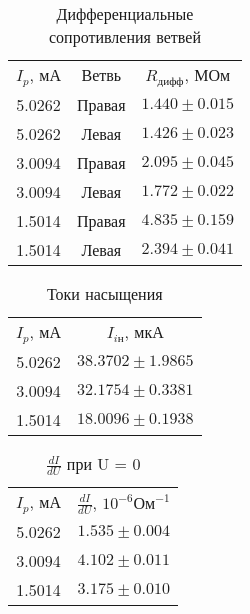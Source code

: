 \documentclass[a4paper]{article}
\begin{document}
    \begin{table}[h]
    \centering
        \begin{tabular}{|c|c|c|}
        \cline{1-3}
        $I_{p}$,  мА & Ветвь& $R_{\text{дифф}}$, МОм \\ \cline{1-3}
        5.0262 & Правая & $1.440\pm0.015$\\ \cline{1-3}
        5.0262 & Левая & $1.426\pm0.023$\\ \cline{1-3}
        3.0094 & Правая & $2.095\pm0.045$\\ \cline{1-3}
        3.0094 & Левая & $1.772\pm0.022$\\ \cline{1-3}
        1.5014 & Правая & $4.835\pm0.159$\\ \cline{1-3}
        1.5014 & Левая & $2.394\pm0.041$\\ \cline{1-3}
        
        \end{tabular}
        \caption{Дифференциальные сопротивления ветвей}
        \label{tab:my_label}
    \end{table}

    \begin{table}[h]
    \centering
        \begin{tabular}{|c|c|}
        \cline{1-2}
        $I_{p}$,  мА & $I_{i\text{н}}$, мкА\\ \cline{1-2}
        5.0262 &  $38.3702\pm1.9865$\\ \cline{1-2}
        3.0094 &  $32.1754\pm0.3381$\\ \cline{1-2}
        1.5014 &  $18.0096\pm0.1938$\\ \cline{1-2}
        
        \end{tabular}
        \caption{Токи насыщения}
        \label{tab:my_label}
    \end{table}

        \begin{table}[h]
    \centering
        \begin{tabular}{|c|c|}
        \cline{1-2}
        $I_{p}$,  мА & $\frac{dI}{dU}$, $10^{-6} \text{Ом}^{-1}$\\ \cline{1-2}
        5.0262 &  $1.535\pm0.004$\\ \cline{1-2}
        3.0094 &  $4.102\pm0.011$\\ \cline{1-2}
        1.5014 &  $3.175 \pm0.010$\\ \cline{1-2}
        
        \end{tabular}
        \caption{$\frac{dI}{dU}$ при U = 0}
        \label{tab:my_label}
    \end{table}
            
\end{document}
